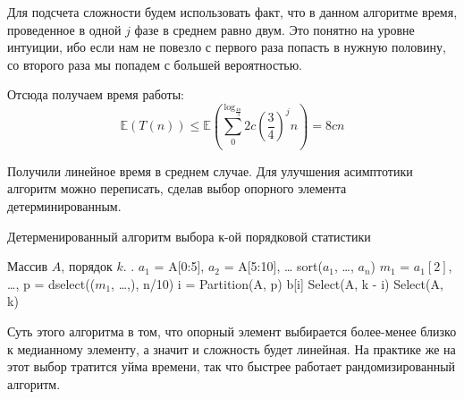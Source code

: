 		Для подсчета сложности будем использовать факт, что в данном алгоритме время, проведенное в одной $j$ фазе в среднем равно двум. Это понятно на уровне интуиции, ибо если нам не повезло с первого раза попасть в нужную половину, со второго раза мы попадем с большей вероятностью.
		
		Отсюда получаем время работы:
		\[\mathbb{E}(T(n)) 
		\leqslant
		\mathbb{E}
		\left(
		\sum_{0}^{\log_\frac{4n}{3}} 2c
		\left(
		{\frac{3}{4}}
		\right)^j n
		\right) =
		8cn
		\]
		
		Получили линейное время в среднем случае. Для улучшения асимптотики алгоритм можно переписать, сделав выбор опорного элемента детерминированным.
		
		\begin{algorithm}[H]
			\caption{Детерменированный алгоритм выбора к-ой порядковой статистики}
			\begin{algorithmic}[1]
				\Require Массив $A$, порядок $k$.
				\Ensure .
					\State $a_1$ = A[0:5], $a_2$ = A[5:10], \ldots
					\State sort($a_1$, \ldots, $a_n$)
					\State $m_1$ = $a_1[2]$, \ldots,
					\State p = dselect(($m_1$, \ldots,), n/10)
					\State i = Partition(A, p)
						\State \Return b[i]
						\State \Return Select(A, k - i)
					\Else
						\State \Return Select(A, k)
					\EndIf
				\EndFunction
			\end{algorithmic}	
		\end{algorithm}
		
		Суть этого алгоритма в том, что опорный элемент выбирается более-менее близко к медианному элементу, а значит и сложность будет линейная. На практике же на этот выбор тратится уйма времени, так что быстрее работает рандомизированный алгоритм.
		
		\begin{comment}
		
		пусть $y$ содержит 10 десятичных цифр
		
		$x^y < \le (10^n)^(10^n)$
		тогда числ цифр оценивается как $n\cdot10^n$, то есть полиномиального алгоритма
		не существует
		алгоритм экспоненциальный
		
		
		
		вычислить $x^{2^k}$ для всех $2^k$:
		$x^{999} = x\cdot x^{2}\cdot x^{4}\cdot x^{32}\cdot x^{64}\cdot\ldos\cdot x^{512}$
		

		
		$T(n) \leq T(\frac{n}{5}) + T(\frac{7n}{10} + cn$
		Покажем, что $T(n) \leq \frac{dn}{5} + \frac{7dn}{10}+cn \leq dn$ при $с
		\geq 10n$
		
		\end{comment}
		
	
